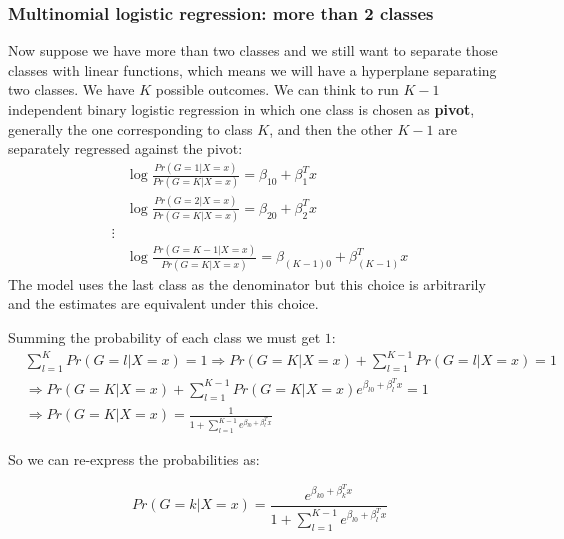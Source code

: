 \documentclass[12pt, letterpaper]{article}
\theoremstyle{definition}
\begin{document}
\subsubsection{Multinomial logistic regression: more than 2 classes}
Now suppose we have more than two classes and we still want to separate those classes with linear functions, which means we will have a hyperplane separating two classes. We have $K$ possible outcomes. We can think to run $K-1$ independent binary logistic regression in which one class is chosen as \textbf{pivot}, generally the one corresponding to class $K$, and then the other $K-1$ are separately regressed against the pivot:
\begin{equation}
\begin{aligned}
&\log \frac{Pr\left(G=1|X=x\right)}{Pr\left(G=K|X=x\right)} = \beta_{10} +\beta_1^T x \\
&\log \frac{Pr\left(G=2|X=x\right)}{Pr\left(G=K|X=x\right)} = \beta_{20} +\beta_2^T x\\
\vdots\\
&\log \frac{Pr\left(G=K-1|X=x\right)}{Pr\left(G=K|X=x\right)} = \beta_{\left(K-1\right)0} +\beta_{\left(K-1\right)}^T x
\end{aligned}
\end{equation}
The model uses the last class as the denominator but this choice is arbitrarily and the estimates are equivalent under this choice.

Summing the probability of each class we must get $1$:
\begin{equation}
\begin{aligned}
&\sum_{l=1}^{K} Pr\left(G=l|X=x\right) = 1 \Rightarrow Pr\left(G=K|X=x\right)+ \sum_{l=1}^{K-1} Pr\left(G=l|X=x\right)=1\\
&\Rightarrow Pr\left(G=K|X=x\right) +\sum_{l=1}^{K-1} Pr\left(G=K|X=x\right)e^{\beta_{l0}+\beta_l^Tx}=1\\
&\Rightarrow Pr\left(G=K|X=x\right)= \frac{1}{1+\sum_{l=1}^{K-1} e^{\beta_{l0}+\beta_l^Tx}}
\end{aligned}
\end{equation}

So we can re-express the probabilities as:

\begin{equation}
Pr\left(G=k|X=x\right) = \frac{e^{\beta_{k0} +\beta_{k}^T x}}{1+\sum_{l=1}^{K-1} e^{\beta_{l0}+\beta_l^Tx}}
\end{equation}
\end{document}

